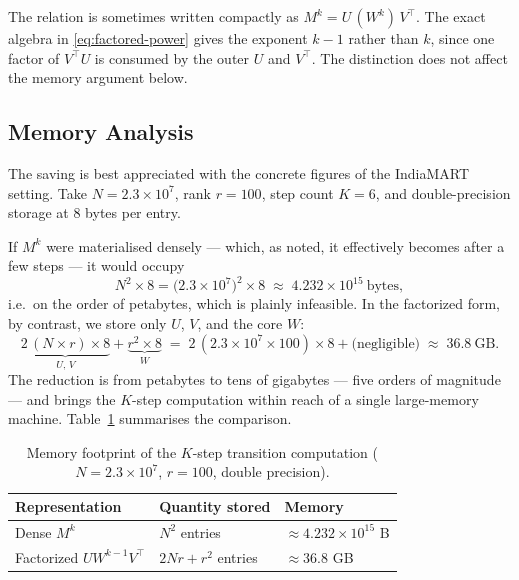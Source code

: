\begin{remark}
The relation is sometimes written compactly as
$M^{k} = U\,(W^{k})\,V^{\top}$. The exact algebra in
\eqref{eq:factored-power} gives the exponent $k-1$ rather than $k$, since one
factor of $V^{\top}U$ is consumed by the outer $U$ and $V^{\top}$. The
distinction does not affect the memory argument below.
\end{remark}

\subsection{Memory Analysis}
\label{sec:mf-memory}
The saving is best appreciated with the concrete figures of the IndiaMART
setting. Take $N = 2.3 \times 10^{7}$, rank $r = 100$, step count $K = 6$, and
double-precision storage at $8$ bytes per entry.

If $M^{k}$ were materialised densely --- which, as noted, it effectively
becomes after a few steps --- it would occupy
\begin{equation}
  N^{2} \times 8
    = \bigl(2.3\times10^{7}\bigr)^{2}\times 8
    \;\approx\; 4.232 \times 10^{15}\ \text{bytes},
\end{equation}
i.e.\ on the order of petabytes, which is plainly infeasible. In the
factorized form, by contrast, we store only $U$, $V$, and the core $W$:
\begin{equation}
  \underbrace{2\,(N \times r)\times 8}_{U,\,V}
   + \underbrace{r^{2}\times 8}_{W}
    \;=\; 2\,(2.3\times10^{7}\times 100)\times 8 + \text{(negligible)}
    \;\approx\; 36.8\ \text{GB}.
\end{equation}
The reduction is from petabytes to tens of gigabytes --- five orders of
magnitude --- and brings the $K$-step computation within reach of a single
large-memory machine. Table~\ref{tab:mf-memory} summarises the comparison.

\begin{table}[ht]
  \centering
  \caption{Memory footprint of the $K$-step transition computation
           ($N=2.3\times10^{7}$, $r=100$, double precision).}
  \label{tab:mf-memory}
  \begin{tabular}{lll}
    \toprule
    Representation & Quantity stored & Memory \\
    \midrule
    Dense $M^{k}$            & $N^{2}$ entries          & $\approx 4.232\times10^{15}$ B \\
    Factorized $U W^{k-1}V^{\top}$ & $2Nr + r^{2}$ entries & $\approx 36.8$ GB \\
    \bottomrule
  \end{tabular}
\end{table}

